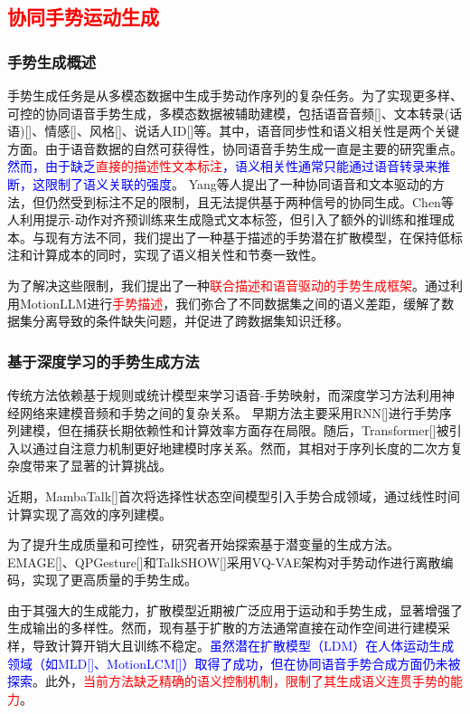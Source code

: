 \subsection{\textcolor{red}{协同手势运动生成}}

\subsubsection{手势生成概述}
手势生成任务是从多模态数据中生成手势动作序列的复杂任务。为了实现更多样、可控的协同语音手势生成，多模态数据被辅助建模，包括语音音频[]、文本转录(话语)[]、情感[]、风格[]、说话人ID[]等。其中，语音同步性和语义相关性是两个关键方面。由于语音数据的自然可获得性，协同语音手势生成一直是主要的研究重点。\textcolor{blue}{然而，由于缺乏\textcolor{red}{直接的描述性文本标注}，语义相关性通常只能通过语音转录来推断，这限制了语义关联的强度}。
Yang等人\cite{yang2024freetalker}提出了一种协同语音和文本驱动的方法，但仍然受到标注不足的限制，且无法提供基于两种信号的协同生成。Chen等人\cite{chen2024syntalker}利用提示-动作对齐预训练来生成隐式文本标签，但引入了额外的训练和推理成本。与现有方法不同，我们提出了一种基于描述的手势潜在扩散模型，在保持低标注和计算成本的同时，实现了语义相关性和节奏一致性。

为了解决这些限制，我们提出了一种\textcolor{red}{联合描述和语音驱动的手势生成框架}。通过利用MotionLLM进行\textcolor{red}{手势描述}，我们弥合了不同数据集之间的语义差距，缓解了数据集分离导致的条件缺失问题，并促进了跨数据集知识迁移。

\subsubsection{基于深度学习的手势生成方法}
传统方法依赖基于规则或统计模型来学习语音-手势映射，而深度学习方法利用神经网络来建模音频和手势之间的复杂关系\cite{nyatsanga2023comprehensive}。
早期方法主要采用RNN[]进行手势序列建模，但在捕获长期依赖性和计算效率方面存在局限。随后，Transformer[]被引入以通过自注意力机制更好地建模时序关系。然而，其相对于序列长度的二次方复杂度带来了显著的计算挑战。

近期，MambaTalk[]首次将选择性状态空间模型引入手势合成领域，通过线性时间计算实现了高效的序列建模。

为了提升生成质量和可控性，研究者开始探索基于潜变量的生成方法。EMAGE[]、QPGesture[]和TalkSHOW[]采用VQ-VAE架构对手势动作进行离散编码，实现了更高质量的手势生成。

由于其强大的生成能力，扩散模型近期被广泛应用于运动和手势生成，显著增强了生成输出的多样性。然而，现有基于扩散的方法通常直接在动作空间进行建模采样，导致计算开销大且训练不稳定。\textcolor{blue}{虽然潜在扩散模型（LDM）在人体运动生成领域（如MLD[]、MotionLCM[]）取得了成功，但在协同语音手势合成方面仍未被探索}。此外，\textcolor{red}{当前方法缺乏精确的语义控制机制，限制了其生成语义连贯手势的能力}。

